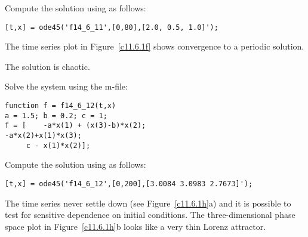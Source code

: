 Compute the solution using \Matlab as follows:
\begin{verbatim}
[t,x] = ode45('f14_6_11',[0,80],[2.0, 0.5, 1.0]');
\end{verbatim}
The time series plot in Figure~\ref{c11.6.1f} shows convergence to a periodic solution.  

\begin{figure}[htb]
     \centerline{%
     }
\end{figure} 

 \ans The solution is chaotic.

\soln Solve the system using the m-file:
\begin{verbatim}
function f = f14_6_12(t,x)
a = 1.5; b = 0.2; c = 1;
f = [    -a*x(1) + (x(3)-b)*x(2);
-a*x(2)+x(1)*x(3);   
     c - x(1)*x(2)];
\end{verbatim}

Compute the solution using \Matlab as follows:
\begin{verbatim}
[t,x] = ode45('f14_6_12',[0,200],[3.0084 3.0983 2.7673]');
\end{verbatim}
The time series never settle down (see Figure~\ref{c11.6.1h}a) and it is 
possible to test for sensitive dependence on initial conditions. 
The three-dimensional phase space plot in Figure~\ref{c11.6.1h}b looks like 
a very thin Lorenz attractor.  

\begin{figure}[htb]
     \centerline{%
     }
\end{figure} 

















